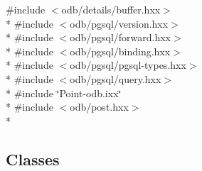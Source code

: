{\ttfamily \#include $<$odb/details/buffer.\+hxx$>$}\\*
{\ttfamily \#include $<$odb/pgsql/version.\+hxx$>$}\\*
{\ttfamily \#include $<$odb/pgsql/forward.\+hxx$>$}\\*
{\ttfamily \#include $<$odb/pgsql/binding.\+hxx$>$}\\*
{\ttfamily \#include $<$odb/pgsql/pgsql-\/types.\+hxx$>$}\\*
{\ttfamily \#include $<$odb/pgsql/query.\+hxx$>$}\\*
{\ttfamily \#include \char`\"{}Point-\/odb.\+ixx\char`\"{}}\\*
{\ttfamily \#include $<$odb/post.\+hxx$>$}\\*
\subsection*{Classes}
